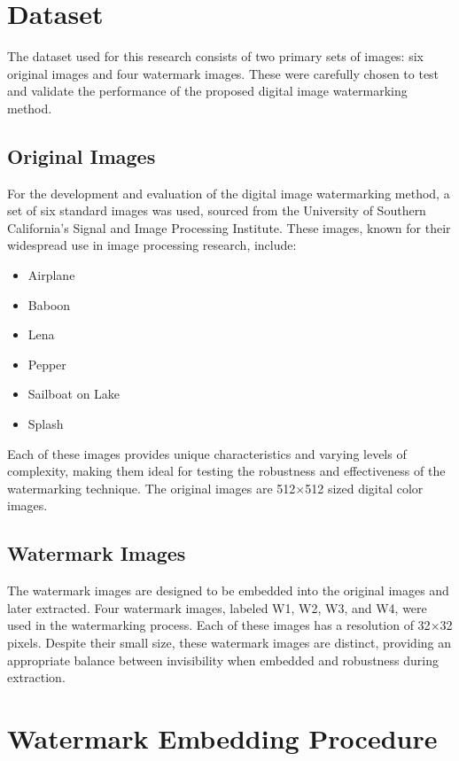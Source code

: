 \section{Dataset}

The dataset used for this research consists of two primary sets of images: six original images and four watermark images. These were carefully chosen to test and validate the performance of the proposed digital image watermarking method.

\subsection{Original Images}

For the development and evaluation of the digital image watermarking method, a set of six standard images was used, sourced from the University of Southern California's Signal and Image Processing Institute. These images, known for their widespread use in image processing research, include:

\begin{itemize}
    \item Airplane
    \item Baboon
    \item Lena
    \item Pepper
    \item Sailboat on Lake
    \item Splash
\end{itemize}

Each of these images provides unique characteristics and varying levels of complexity, making them ideal for testing the robustness and effectiveness of the watermarking technique. The original images are 512$\times$512 sized digital color images.

\subsection{Watermark Images}

The watermark images are designed to be embedded into the original images and later extracted. Four watermark images, labeled W1, W2, W3, and W4, were used in the watermarking process. Each of these images has a resolution of 32$\times$32 pixels. Despite their small size, these watermark images are distinct, providing an appropriate balance between invisibility when embedded and robustness during extraction.

\section{Watermark Embedding Procedure}

